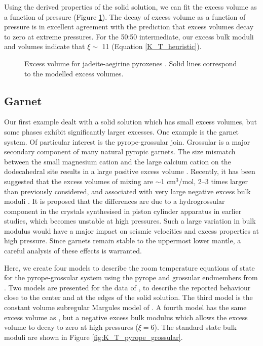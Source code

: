 Using the derived properties of the solid solution, we can fit the excess volume as a function of pressure (Figure \ref{fig:excess_volume_jadeite_aegirine}). The decay of excess volume as a function of pressure is in excellent agreement with the prediction that excess volumes decay to zero at extreme pressures. For the 50:50 intermediate, our excess bulk moduli and volumes indicate that $\xi \sim$ 11 (Equation \ref{K_T_heuristic}).

\begin{figure}[ht!]
  \centering
  \caption{Excess volume for jadeite-aegirine pyroxenes \citep{NBLBT2006}. Solid lines correspond to the modelled excess volumes.}
  \label{fig:excess_volume_jadeite_aegirine}
\end{figure}

\subsection{Garnet}
Our first example dealt with a solid solution which has small excess volumes, but some phases exhibit significantly larger excesses. One example is the garnet system. Of particular interest is the pyrope-grossular join. Grossular is a major secondary component of many natural pyropic garnets. The size mismatch between the small magnesium cation and the large calcium cation on the dodecahedral site results in a large positive excess volume \citep{NCK1977, BG1997, GCT1996}. Recently, it has been suggested that the excess volumes of mixing are $\sim$1 cm$^3$/mol, 2--3 times larger than previously considered, and associated with very large negative excess bulk moduli \citep{DCW2015}. It is proposed that the differences are due to a hydrogrossular component in the crystals synthesised in piston cylinder apparatus in earlier studies, which becomes unstable at high pressures. Such a large variation in bulk modulus would have a major impact on seismic velocities and excess properties at high pressure. Since garnets remain stable to the uppermost lower mantle, a careful analysis of these effects is warranted.

Here, we create four models to describe the room temperature equations of state for the pyrope-grossular system using the pyrope and grossular endmembers from \cite{HP2011}. Two models are presented for the data of \citep{DCW2015}, to describe the reported behaviour close to the center and at the edges of the solid solution. The third model is the constant volume subregular Margules model of \cite{GCT1996}. A fourth model has the same excess volume as \cite{GCT1996}, but a negative excess bulk modulus which allows the excess volume to decay to zero at high pressures ($\xi=6$). The standard state bulk moduli are shown in Figure \ref{fig:K_T_pyrope_grossular}.


